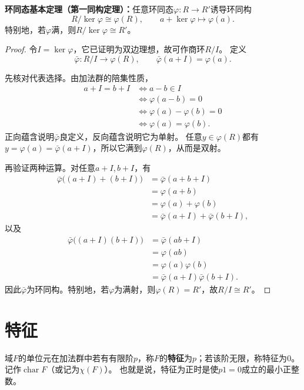 \begin{theorem}\label{p2:ring-first-iso}
\textbf{环同态基本定理（第一同构定理）：}任意环同态$\varphi:R\to R'$诱导环同构
\[
R/\ker\varphi\cong\varphi(R),\qquad a+\ker\varphi\longmapsto\varphi(a).
\]
特别地，若$\varphi$满，则$R/\ker\varphi\cong R'$。
\end{theorem}
\begin{proof}
令$I=\ker\varphi$，它已证明为双边理想，故可作商环$R/I$。
定义
\[
\bar\varphi:R/I\longrightarrow\varphi(R),\qquad
\bar\varphi(a+I)=\varphi(a).
\]

先核对代表选择。由加法群的陪集性质，
\[
\begin{aligned}
a+I=b+I
&\iff a-b\in I\\
&\iff\varphi(a-b)=0\\
&\iff\varphi(a)-\varphi(b)=0\\
&\iff\varphi(a)=\varphi(b).
\end{aligned}
\]
正向蕴含说明$\bar\varphi$良定义，反向蕴含说明它为单射。
任意$y\in\varphi(R)$都有$y=\varphi(a)=\bar\varphi(a+I)$，所以它满到$\varphi(R)$，从而是双射。

再验证两种运算。对任意$a+I,b+I$，有
\[
\begin{aligned}
\bar\varphi\bigl((a+I)+(b+I)\bigr)
&=\bar\varphi(a+b+I)\\
&=\varphi(a+b)\\
&=\varphi(a)+\varphi(b)\\
&=\bar\varphi(a+I)+\bar\varphi(b+I),
\end{aligned}
\]
以及
\[
\begin{aligned}
\bar\varphi\bigl((a+I)(b+I)\bigr)
&=\bar\varphi(ab+I)\\
&=\varphi(ab)\\
&=\varphi(a)\varphi(b)\\
&=\bar\varphi(a+I)\bar\varphi(b+I).
\end{aligned}
\]
因此$\bar\varphi$为环同构。特别地，若$\varphi$为满射，则$\varphi(R)=R'$，故$R/I\cong R'$。
\end{proof}
\section{特征}
\begin{definition}
域$F$的单位元在加法群中若有有限阶$p$，称$F$的\textbf{特征}为$p$；若该阶无限，称特征为$0$。
记作$\operatorname{char}F$（或记为$\chi(F)$）。
也就是说，特征为正时是使$p1=0$成立的最小正整数。
\end{definition}


